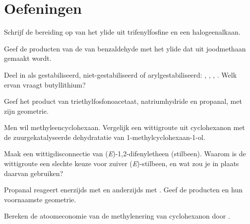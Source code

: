 \section{Oefeningen}

\begin{exercise}[$\star$]\label{exo:b2:wittig:1}
Schrijf de bereiding op van het ylide  uit trifenylfosfine en een halogeenalkaan.
\end{exercise}

\begin{exercise}[$\star$]\label{exo:b2:wittig:2}
Geef de producten van de  van benzaldehyde met het ylide dat uit joodmethaan gemaakt wordt.
\end{exercise}

\begin{exercise}[$\star$]\label{exo:b2:wittig:3}
Deel in als gestabiliseerd, niet-gestabiliseerd of arylgestabiliseerd: , ,
, . Welk ervan vraagt butyllithium?
\end{exercise}

\begin{exercise}[$\star$]\label{exo:b2:wittig:4}
Geef het product van triethylfosfonoacetaat, natriumhydride en propanal, met zijn geometrie.
\end{exercise}

\begin{exercise}[$\star\star$]\label{exo:b2:wittig:5}
Men wil methyleencyclohexaan. Vergelijk een wittigroute uit cyclohexanon met de zuurgekatalyseerde
dehydratatie van 1-methylcyclohexaan-1-ol.
\end{exercise}

\begin{exercise}[$\star\star$]\label{exo:b2:wittig:6}
Maak een wittigdisconnectie van (\textit{E})-1,2-difenyletheen (stilbeen). Waarom is de wittigroute
een slechte keuze voor zuiver (\textit{E})-stilbeen, en wat zou je in plaats daarvan gebruiken?
\end{exercise}

\begin{exercise}[$\star\star$]\label{exo:b2:wittig:7}
Propanal reageert enerzijds met  en anderzijds met . Geef de
producten en hun voornaamste geometrie.
\end{exercise}

\begin{exercise}[$\star\star$]\label{exo:b2:wittig:8}
Bereken de atoomeconomie van de methylenering van cyclohexanon door .
\end{exercise}

